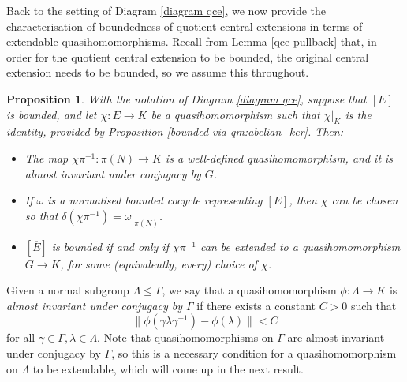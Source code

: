 \documentclass[svgnames]{amsart}
\theoremstyle{plain}
\newtheorem{prop}[thm]{Proposition}
\theoremstyle{definition}
\begin{document}
Back to the setting of Diagram \eqref{diagram qce}, we now provide the characterisation of boundedness of quotient central extensions in terms of extendable quasihomomorphisms. Recall from Lemma \ref{qce pullback} that, in order for the quotient central extension to be bounded, the original central extension needs to be bounded, so we assume this throughout.

\begin{prop}
\label{bounded iff extendable}
    With the notation of Diagram \eqref{diagram qce}, suppose that $[E]$ is bounded, and let $\chi \colon E \to K$ be a quasihomomorphism such that $\chi|_K$ is the identity, provided by Proposition \ref{bounded via qm:abelian_ker}. Then:
    \begin{itemize}
        \item The map $\chi \pi^{-1} \colon \pi(N) \to K$ is a well-defined quasihomomorphism, and it is almost invariant under conjugacy by $G$. 
        \item If $\omega$ is a normalised bounded cocycle representing $[E]$, then $\chi$ can be chosen so that $\delta(\chi\pi^{-1}) = \omega|_{\pi(N)}$.
        \item $[\overline{E}]$ is bounded if and only if $\chi \pi^{-1}$ can be extended to a quasihomomorphism $G \to K$, for some (equivalently, every) choice of $\chi$.
    \end{itemize}
\end{prop}

Given a normal subgroup $\Lambda \le \Gamma$, we say that a quasihomomorphism $\phi \colon \Lambda \to K$ is \emph{almost invariant under conjugacy by $\Gamma$} if there exists a constant $C > 0$ such that
\[\| \phi(\gamma \lambda \gamma^{-1}) - \phi(\lambda) \| < C\]
for all $\gamma \in \Gamma, \lambda \in \Lambda$. Note that quasihomomorphisms on $\Gamma$ are almost invariant under conjugacy by $\Gamma$, so this is a necessary condition for a quasihomomorphism on $\Lambda$ to be extendable, which will come up in the next result.
\end{document}
